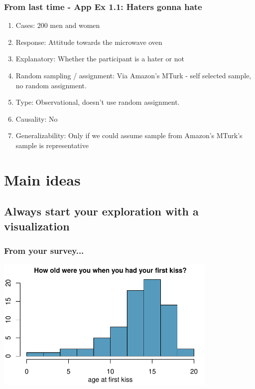 \documentclass[11pt,containsverbatim,handout,xcolor=xelatex,dvipsnames,table]{beamer}
\newcommand{\soln}[1]{}
\begin{document}

\begin{frame}
\frametitle{From last time - App Ex 1.1: Haters gonna hate}

\begin{enumerate}

\item Cases: 200 men and women
\item Response: Attitude towards the microwave oven
\item Explanatory: Whether the participant is a hater or not
\item Random sampling / assignment: Via Amazon's MTurk - self selected sample, no random assignment.
\item Type: Observational, doesn't use random assignment. 
\item Causality: No
\item Generalizability: Only if we could assume sample from Amazon's MTurk's sample is representative

\end{enumerate}

\end{frame}



\section{Main ideas}


\subsection{Always start your exploration with a visualization}
\label{mi1}


\begin{frame}[fragile]
\frametitle{From your survey...}


\begin{center}
\includegraphics[width=0.8\textwidth]{figures/survey/hist_first_kiss} 
\end{center}

\pause

\soln{Some people reported very low ages, which might suggest the survey question wasn't clear: romantic kiss or any kiss?}

\end{frame}
\end{document}
